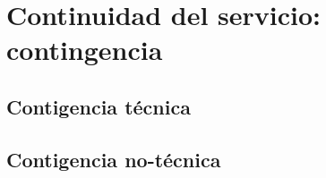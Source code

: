 \section{Continuidad del servicio: contingencia}

\subsection{Contigencia t\'ecnica}

\subsection{Contigencia no-t\'ecnica}

